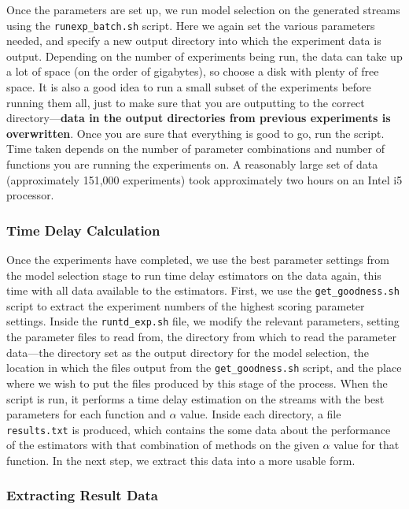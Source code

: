\documentclass[a4paper,11pt,twoside]{article}
\begin{document}
\begin{appendices}
    Once the parameters are set up, we run model selection on the generated streams
    using the \texttt{runexp\_batch.sh} script. Here we again set the various
    parameters needed, and specify a new output directory into which the experiment
    data is output. Depending on the number of experiments being run, the data can
    take up a lot of space (on the order of gigabytes), so choose a disk with plenty
    of free space. It is also a good idea to run a small subset of the experiments
    before running them all, just to make sure that you are outputting to the
    correct directory---\textbf{data in the output directories from previous
    experiments is overwritten}. Once you are sure that everything is good to go,
    run the script. Time taken depends on the number of parameter combinations and
    number of functions you are running the experiments on. A reasonably large set
    of data (approximately 151,000 experiments) took approximately two hours on an
    Intel i5 processor.
\subsubsection{Time Delay Calculation}
\label{sec-10-3-5}

    Once the experiments have completed, we use the best parameter settings from the
    model selection stage to run time delay estimators on the data again, this time
    with all data available to the estimators. First, we use the
    \texttt{get\_goodness.sh} script to extract the experiment numbers of the
    highest scoring parameter settings. Inside the \texttt{runtd\_exp.sh} file, we
    modify the relevant parameters, setting the parameter files to read from, the
    directory from which to read the parameter data---the directory set as the
    output directory for the model selection, the location in which the files output
    from the \texttt{get\_goodness.sh} script, and the place where we wish to put
    the files produced by this stage of the process. When the script is run, it
    performs a time delay estimation on the streams with the best parameters for
    each function and $\alpha$ value. Inside each directory, a file
    \texttt{results.txt} is produced, which contains the some data about the
    performance of the estimators with that combination of methods on the given
    $\alpha$ value for that function. In the next step, we extract this data into a
    more usable form.
\subsubsection{Extracting Result Data}
\label{sec-10-3-6}


\end{appendices}
\end{document}
